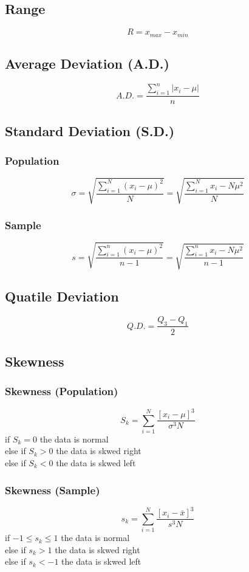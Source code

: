 \documentclass{article}
\begin{document}
    \subsection{Range}
    \begin{equation}
        R = x_{max} - x_{min}
    \end{equation}
    \subsection{Average Deviation (A.D.)}
    \begin{equation}
        A.D. = \frac{\sum_{i=1}^{n} |x_{i}-\mu|}{n}
    \end{equation}
    \subsection{Standard Deviation (S.D.)}
    \subsubsection{Population}
    \begin{equation}
        \sigma = \sqrt{\frac{\sum_{i=1}^{N} (x_{i}-\mu)^2}{N}} = \sqrt{\frac{\sum_{i=1}^{N} x_{i} -N\mu^2}{N}}
    \end{equation}
    \subsubsection{Sample}
    \begin{equation}
        s = \sqrt{\frac{\sum_{i=1}^{n} (x_{i}-\mu)^2}{n-1}} = \sqrt{\frac{\sum_{i=1}^{n} x_{i} -N\mu^2}{n-1}}
    \end{equation}
    \subsection{Quatile Deviation}
    \begin{equation}
        Q.D. = \frac{Q_{3} - Q_{1}}{2}
    \end{equation}
    \subsection{Skewness}
    \subsubsection{Skewness (Population)}
    \begin{equation}
        S_{k} = \sum_{i=1}^{N}\frac{[x_{i} - \mu]^{3}}{\sigma^{3}N}
    \end{equation}
    if $S_{k} = 0$ the data is normal\\
    else if $S_{k} > 0$ the data is skwed right\\
    else if $S_{k} < 0$ the data is skwed left
    \subsubsection{Skewness (Sample)}
    \begin{equation}
        s_{k} = \sum_{i=1}^{N}\frac{[x_{i} - \bar{x}]^{3}}{s^{3}N}
    \end{equation}
    if $-1 \leq s_{k} \leq 1$ the data is normal\\
    else if $s_{k} > 1$ the data is skwed right\\
    else if $s_{k} < -1$ the data is skwed left
\end{document}
